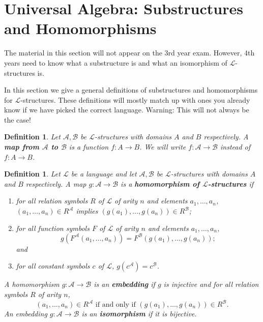 \documentclass[11pt]{article}
\newtheorem{definition}[theorem]{Definition}
\newcommand{\mcal}[1]{\mathcal{#1}}
\begin{document}
\section{Universal Algebra: Substructures and Homomorphisms}\label{unialg}
{\color{gray}The material in this section will not appear on the 3rd year exam. However, 4th years need to know what a substructure is and what an isomorphism of $\mcal{L}$-structures is.}

In this section we give a general definitions of substructures and homomorphisms for $\mcal{L}$-structures. These definitions will mostly match up with ones you already know if we have picked the correct language. Warning: This will not always be the case!

\begin{definition}
Let $\mcal{A},\mcal{B}$ be $\mcal{L}$-structures with domains $A$ and $B$ respectively. A \textbf{map from $\mcal{A}$ to $\mcal{B}$} is a function $f:A\rightarrow B$. We will write $f:\mcal{A}\rightarrow \mcal{B}$ instead of $f:A\rightarrow B$.
\end{definition}


\begin{definition}
Let $\mcal{L}$ be a language and let $\mcal{A},\mcal{B}$ be $\mcal{L}$-structures with domains $A$ and $B$ respectively. A map $g:\mcal{A}\rightarrow \mcal{B}$ is a \textbf{homomorphism of $\mcal{L}$-structures} if
\begin{enumerate}
\item for all relation symbols $R$ of $\mcal{L}$ of arity $n$ and elements $a_1,\ldots,a_n$, $(a_1,\ldots,a_n)\in R^{\mcal{A}}$ implies $(g(a_1),\ldots,g(a_n))\in R^{\mcal{B}}$;
\item for all function symbols $F$ of $\mcal{L}$ of arity $n$ and elements $a_1,\ldots,a_n$, \[g(F^{\mcal{A}}(a_1,\ldots,a_n))=F^{\mcal{B}}(g(a_1),\ldots,g(a_n));\] and
\item for all constant symbols $c$ of $\mcal{L}$, $g(c^{\mcal{A}})=c^{\mcal{B}}$.
\end{enumerate}
A homomorphism $g:\mcal{A}\rightarrow \mcal{B}$ is an \textbf{embedding} if $g$ is injective and for all relation symbols $R$ of arity $n$,
\[(a_1,\ldots,a_n)\in R^{\mcal{A}} \text{ if and only if }(g(a_1),\ldots,g(a_n))\in R^{\mcal{B}}.\]
An embedding $g:\mcal{A}\rightarrow \mcal{B}$ is an \textbf{isomorphism} if it is bijective.
\end{definition}
\end{document}
